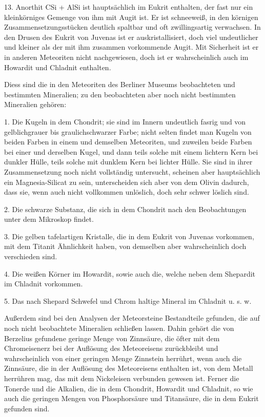 \documentclass[a4paper, 11pt, oneside]{article}
\begin{document}
13. Anorthit CSi + AlSi ist hauptsächlich im Eukrit enthalten, der fast nur ein kleinkörniges Gemenge von ihm mit Augit ist. Er ist schneeweiß, in den körnigen Zusammensetzungsstücken deutlich spaltbar und oft zwillingsartig verwachsen. In den Drusen des Eukrit von Juvenas ist er auskristallisiert, doch viel undeutlicher und kleiner als der mit ihm zusammen vorkommende Augit. Mit Sicherheit ist er in anderen Meteoriten nicht nachgewiesen, doch ist er wahrscheinlich auch im Howardit und Chladnit enthalten.

Diess sind die in den Meteoriten des Berliner Museums beobachteten und bestimmten Mineralien; zu den beobachteten aber noch nicht bestimmten Mineralien gehören:

1. Die Kugeln in dem Chondrit; sie sind im Innern undeutlich fasrig und von gelblichgrauer bis graulichschwarzer Farbe; nicht selten findet man Kugeln von beiden Farben in einem und demselben Meteoriten, und zuweilen beide Farben bei einer und derselben Kugel, und dann teils solche mit einem lichtern Kern bei dunkler Hülle, teils solche mit dunklem Kern bei lichter Hülle. Sie sind in ihrer Zusammensetzung noch nicht vollständig untersucht, scheinen aber hauptsächlich ein Magnesia-Silicat zu sein, unterscheiden sich aber von dem Olivin dadurch, dass sie, wenn auch nicht vollkommen unlöslich, doch sehr schwer löslich sind.

2. Die schwarze Substanz, die sich in dem Chondrit nach den Beobachtungen unter dem Mikroskop findet.

3. Die gelben tafelartigen Kristalle, die in dem Eukrit von Juvenas vorkommen, mit dem Titanit Ähnlichkeit haben, von demselben aber wahrscheinlich doch verschieden sind.

4. Die weißen Körner im Howardit, sowie auch die, welche neben dem Shepardit im Chladnit vorkommen.

5. Das nach Shepard Schwefel und Chrom haltige Mineral im Chladnit u. s. w.

Außerdem sind bei den Analysen der Meteorsteine Bestandteile gefunden, die auf noch nicht beobachtete Mineralien schließen lassen. Dahin gehört die von Berzelius gefundene geringe Menge von Zinnsäure, die öfter mit dem Chromeisenerz bei der Auflösung des Meteoreisens zurückbleibt und wahrscheinlich von einer geringen Menge Zinnstein herrührt, wenn auch die Zinnsäure, die in der Auflösung des Meteoreisens enthalten ist, von dem Metall herrühren mag, das mit dem Nickeleisen verbunden gewesen ist. Ferner die Tonerde und die Alkalien, die in dem Chondrit, Howardit und Chladnit, so wie auch die geringen Mengen von Phosphorsäure und Titansäure, die in dem Eukrit gefunden sind.
\end{document}
